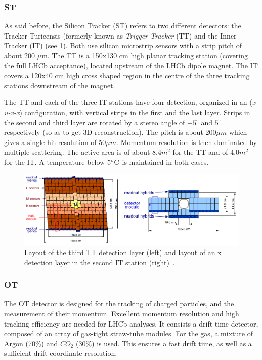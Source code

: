 \subsubsection{ST} 
As said before, the Silicon Tracker (ST) refers to two different detectors: the Tracker Turicensis (formerly known as \textit{Trigger Tracker} (TT) and the Inner Tracker (IT) (see \ref{fig:lhcb_st}). Both use silicon microstrip sensors with a strip pitch of about 200 $\mu$m. 
The TT is a 150x130 cm high planar tracking station (covering the full LHCb acceptance), located upstream of the LHCb dipole magnet. The IT covers a 120x40 cm high cross shaped region in the centre of the three tracking stations downstream of the magnet. 

The TT and each of the three IT stations have four detection, organized in an (\textit{x-u-v-x}) configuration, with vertical strips in the first and the last layer. Strips in the second and third layer are rotated by a stereo angle of $-5^{\circ}$ and $5^{\circ}$ respectively (so as to get 3D reconstruction). The pitch is about $200\mu m$ which gives a single hit resolution of 50$\mu m$. Momentum resolution is then dominated by multiple scattering. The active area is of about $8.4m^2$ for the TT and of $4.0m^2$ for the IT. A temperature below $5^{\circ}\rm C$ is maintained in both cases.  

\begin{figure} [htb!]
\begin{center}
\includegraphics[scale=0.6]{figs/lhcb_st.png}
\caption{Layout of the third TT detection layer (left) and layout of an x detection layer in the second IT station (right)~\cite{Alves:2008zz}.\label{fig:lhcb_st}}
\end{center}
\end{figure}

\subsubsection{OT} %
The OT detector is designed for the tracking of charged particles, and the measurement of their momentum. Excellent momentum resolution and high tracking efficiency are needed for LHCb analyses. It consists  a drift-time detector, composed of an array of gas-tight straw-tube modules. For the gas, a mixture of Argon (70\%) and $CO_2$ (30\%) is used. This ensures a fast drift time, as well as a sufficient drift-coordinate resolution. 

